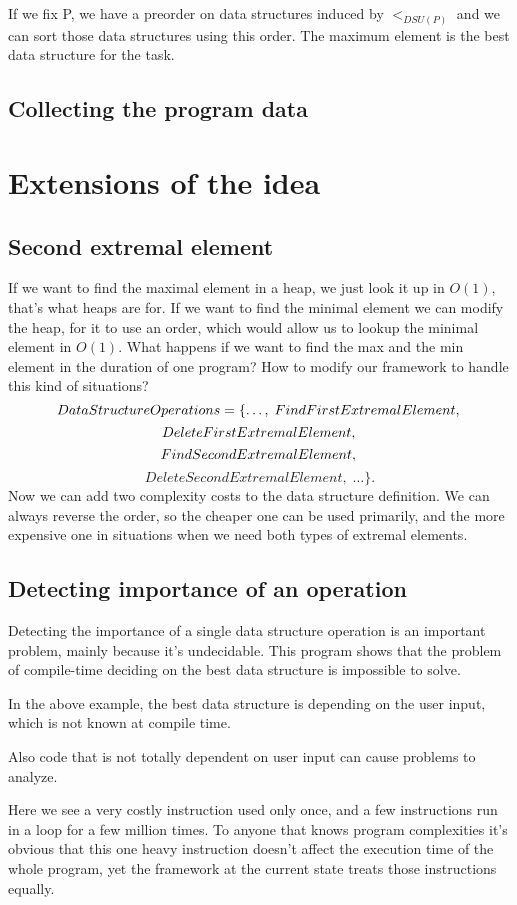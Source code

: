 \documentclass[11pt]{article}
\begin{document}
		If we fix P, we have a preorder on data structures induced by $<_{DSU(P)}$
		and we can sort those data structures using this order. The maximum element is the best data structure for the task.
	\subsection{Collecting the program data}

\pagebreak

\section{Extensions of the idea}
	\subsection{Second extremal element}
		If we want to find the maximal element in a heap, we just look it up in $O(1)$, that's what heaps are for.
		If we want to find the minimal element we can modify the heap, for it to use an order,
		which would allow us to lookup the minimal element in $O(1)$.
		What happens if we want to find the max and the min element in the duration of one program?
		How to modify our framework to handle this kind of situations?
		  	$$DataStructureOperations = \{\dots, \; FindFirstExtremalElement,\\$$
			$$	DeleteFirstExtremalElement,\\$$
			$$	FindSecondExtremalElement,\\$$
			$$	DeleteSecondExtremalElement, \; \dots\}.$$
		Now we can add two complexity costs to the data structure definition. We can always reverse the order,
		so the cheaper one can be used primarily, and the more expensive one in situations when we need
		both types of extremal elements.
	\subsection{Detecting importance of an operation}
		Detecting the importance of a single data structure operation is an important problem, mainly because it's undecidable.
		This program shows that the problem of compile-time deciding on the best data structure is impossible to solve.
		
		In the above example, the best data structure is depending on the user input, which is not known at compile time.

		Also code that is not totally dependent on user input can cause problems to analyze.
		
		Here we see a very costly instruction used only once, and a few instructions run in a loop for a few million times.
		To anyone that knows program complexities it's obvious that this one heavy instruction
		doesn't affect the execution time of the whole program, yet the framework at the current state
		treats those instructions equally.
\end{document}
